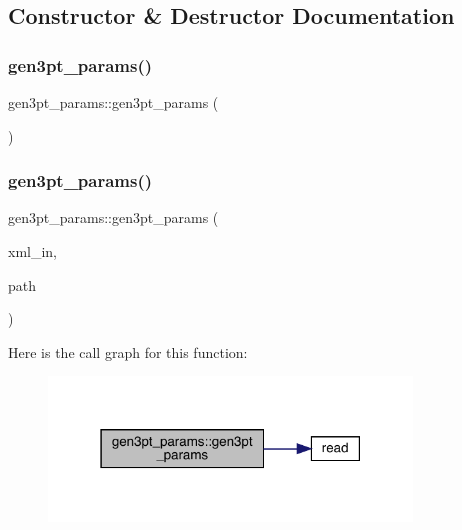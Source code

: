 \subsection{Constructor \& Destructor Documentation}
\mbox{\label{structgen3pt__params_abbd834a70ef2f97528dbe72ff6984728}} 
\subsubsection{\texorpdfstring{gen3pt\_params()}{gen3pt\_params()}\hspace{0.1cm}{\footnotesize\ttfamily [1/4]}}
{\footnotesize\ttfamily gen3pt\+\_\+params\+::gen3pt\+\_\+params (\begin{DoxyParamCaption}{ }\end{DoxyParamCaption})\hspace{0.3cm}{\ttfamily [inline]}}

\mbox{\label{structgen3pt__params_a0834853ca628d91134726107274bc120}} 
\subsubsection{\texorpdfstring{gen3pt\_params()}{gen3pt\_params()}\hspace{0.1cm}{\footnotesize\ttfamily [2/4]}}
{\footnotesize\ttfamily gen3pt\+\_\+params\+::gen3pt\+\_\+params (\begin{DoxyParamCaption}\item[{X\+M\+L\+Reader \&}]{xml\+\_\+in,  }\item[{const string \&}]{path }\end{DoxyParamCaption})}

Here is the call graph for this function\+:
\nopagebreak
\begin{figure}[H]
\begin{center}
\leavevmode
\includegraphics[width=274pt]{d6/d7c/structgen3pt__params_a0834853ca628d91134726107274bc120_cgraph}
\end{center}
\end{figure}
\mbox{\label{structgen3pt__params_abbd834a70ef2f97528dbe72ff6984728}} 
